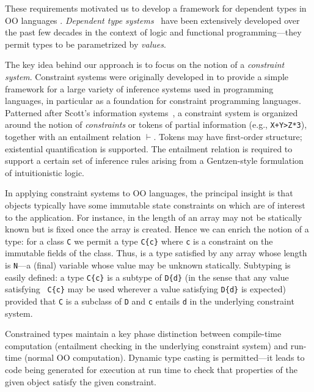 These requirements motivated us to develop a framework for dependent
types in OO languages \cite{constrained-types}.  {\em Dependent type
systems}~\cite{dependent-types,xi99dependent,ocrz-ecoop03,aspinall-attapl,cayenne,epigram-matter,calc-constructions}
have been extensively developed over the past few decades in the
context of logic and functional programming---they permit types to be
parametrized by {\em values}.

The key idea behind our approach is to focus on the notion of a {\em
constraint system}. Constraint systems were originally developed in
\cite{cccc} to provide a simple framework for a large variety of
inference systems used in programming languages, in particular as a
foundation for constraint programming languages.  Patterned after
Scott's information systems~\cite{info-sys}, a constraint system is
organized around the notion of {\em constraints} or tokens of partial
information (e.g., {\tt X+Y>Z*3}), together with an entailment
relation $\vdash$.  Tokens may have first-order structure; existential
quantification is supported. The entailment relation is required to
support a certain set of inference rules arising from a Gentzen-style
formulation of intuitionistic logic.

In applying constraint systems to OO languages, the principal insight
is that objects typically have some immutable state constraints on
which are of interest to the application.  For instance, in \Java{}
the length of an array may not be statically known but is fixed once
the array is created. Hence we can enrich the notion of a type: for a
class {\tt C} we permit a type {\tt C\{c\}} where {\tt c} is a
constraint on the immutable fields of the class. Thus,
 is a type satisfied by any array whose length
is {\tt N}---a (final) variable whose value may be unknown
statically. Subtyping is easily defined: a type {\tt C\{c\}} is a
subtype of {\tt D\{d\}} (in the sense that any value satisfying {\tt
C\{c\}} may be used wherever a value satisfying {\tt D\{d\}} is
expected) provided that {\tt C} is a subclass of {\tt D} and {\tt c}
entails {\tt d} in the underlying constraint system.

Constrained types maintain a key phase distinction between
compile-time computation (entailment checking in the underlying
constraint system) and run-time (normal OO computation).  Dynamic type
casting is permitted---it leads to code being generated for execution
at run time to check that properties of the given object satisfy the
given constraint. 

